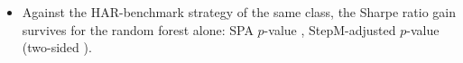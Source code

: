 \begin{itemize}
\begin{itemize}
    (two-sided adjusted $p$-values at most \rhmcsMidShortSrPTwoMax{} and \rhmcsBaShortSrPTwoMax).
    For the mean daily return differential the SPA $p$-value
    is \rhmcsMidShortMeanSpaC, and StepM rejects \rhmcsMidShortMeanNRej{} of the \rhmcsNAlt{} hypotheses.
  \item Against the HAR-benchmark strategy of the same class, the Sharpe ratio gain survives for the random forest
    alone: SPA $p$-value \rhmcsMidTwinSrSpaC, StepM-adjusted $p$-value \rhmcsMidTwinSrPRf{} (two-sided
    \rhmcsMidTwinSrPTwoRf).
  \end{itemize}
\end{itemize}

